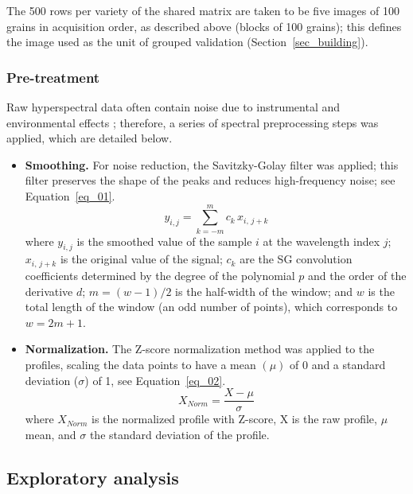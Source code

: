 \documentclass[final,5p,times,twocolumn]{elsarticle}
\newcommand{\added}[1]{{\color{blue}#1}}
\begin{document}
\added{The 500 rows per variety of the shared matrix are taken to be five images of 100 grains in acquisition order, as described above (blocks of 100 grains); this defines the image used as the unit of grouped validation (Section~\ref{sec_building}).}


\subsubsection{Pre-treatment}

Raw hyperspectral data often contain noise due to instrumental and environmental effects \cite{vasquez2018}; therefore, a series of spectral preprocessing steps was applied, which are detailed below.

\begin{itemize}
    \item \textbf{Smoothing.} For noise reduction, the \added{Savitzky-Golay} filter was applied; this filter preserves the shape of the peaks and reduces high-frequency noise; see Equation~\ref{eq_01}.
    \begin{equation}
        y_{i,j} = \sum_{k=-m}^{m} c_{k}\, x_{i,\,j+k}
        \label{eq_01}        
    \end{equation}
    where $y_{i,j}$ is the smoothed value of the sample $i$ at the wavelength index $j$; $x_{i,\,j+k}$ is the original value of the signal; $c_{k}$ are the SG convolution coefficients determined by the degree of the polynomial $p$ and the order of the derivative $d$; $m = (w-1)/2$ is the half-width of the window; and $w$ is the total length of the window (an odd number of points), which corresponds to $w = 2m + 1$.

    \item \textbf{Normalization.} \added{The Z-score normalization method was applied to the profiles, scaling the data points} to have a mean $(\mu)$ of 0 and a standard deviation ($\sigma$) of 1, see Equation~\ref{eq_02}.
    \begin{equation}
        X_{Norm} = \frac{X-\mu}{\sigma}
        \label{eq_02}
    \end{equation}
    \added{where} $X_{Norm}$ \added{is} the normalized profile with Z-score, X is the raw profile, $\mu$ mean, and $\sigma$ the standard deviation of the profile.
\end{itemize}

\subsection{Exploratory analysis}
\end{document}
